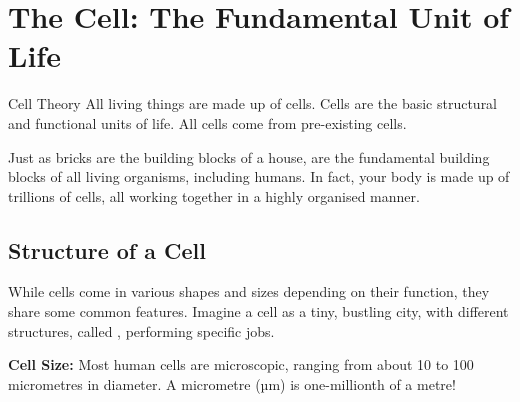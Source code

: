 
\section{The Cell: The Fundamental Unit of Life}

\begin{keyconcept}{Cell Theory}
All living things are made up of cells. Cells are the basic structural and functional units of life. All cells come from pre-existing cells.
\end{keyconcept}

Just as bricks are the building blocks of a house,  are the fundamental building blocks of all living organisms, including humans.  In fact, your body is made up of trillions of cells, all working together in a highly organised manner.

\subsection{Structure of a Cell}

While cells come in various shapes and sizes depending on their function, they share some common features.  Imagine a cell as a tiny, bustling city, with different structures, called , performing specific jobs.

\begin{marginnote}
\textbf{Cell Size:} Most human cells are microscopic, ranging from about 10 to 100 micrometres in diameter.  A micrometre (µm) is one-millionth of a metre!
\end{marginnote}

